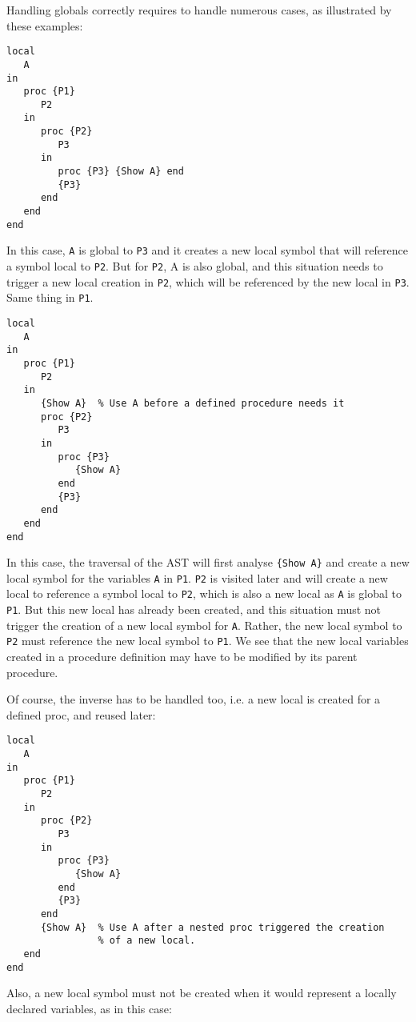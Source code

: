 \documentclass[a4paper]{memoir}
\begin{document}
Handling globals correctly requires to handle numerous cases, as illustrated by these examples:

\begin{lstlisting}
local
   A
in
   proc {P1}
      P2
   in
      proc {P2}
         P3
      in
         proc {P3} {Show A} end
         {P3}
      end
   end
end
\end{lstlisting}
In this case, \lstinline!A! is global to \lstinline!P3! and it creates a new local symbol that will reference a symbol local to \lstinline!P2!. But for \lstinline!P2!, A is also global, and this situation needs to trigger a new local creation in \lstinline!P2!, which will be referenced by the new local in \lstinline!P3!. Same thing in \lstinline!P1!.

\begin{lstlisting}
local
   A
in
   proc {P1}
      P2
   in
      {Show A}  % Use A before a defined procedure needs it
      proc {P2}
         P3
      in
         proc {P3}
            {Show A}
         end
         {P3}
      end
   end
end
\end{lstlisting}

In this case, the traversal of the AST will first analyse \lstinline!{Show A}! and create a new local symbol for the variables \lstinline!A! in \lstinline!P1!. \lstinline!P2! is visited later and will create a new local to reference a symbol local to \lstinline!P2!, which is also a new local as \lstinline!A! is global to \lstinline!P1!. But this new local has already been created, and this situation must not trigger the creation of a new local symbol for \lstinline!A!. Rather, the new local symbol to \lstinline!P2! must reference the new local symbol to \lstinline!P1!. We see that the new local variables created in a procedure definition may have to be modified by its parent procedure.

Of course, the inverse has to be handled too, i.e. a new local is created for a defined proc, and reused later:

\begin{lstlisting}
local
   A
in
   proc {P1}
      P2
   in
      proc {P2}
         P3
      in
         proc {P3}
            {Show A}
         end
         {P3}
      end
      {Show A}  % Use A after a nested proc triggered the creation 
                % of a new local.
   end
end
\end{lstlisting}


Also, a new local symbol must not be created when it would represent a locally declared variables, as in this case:
\end{document}
